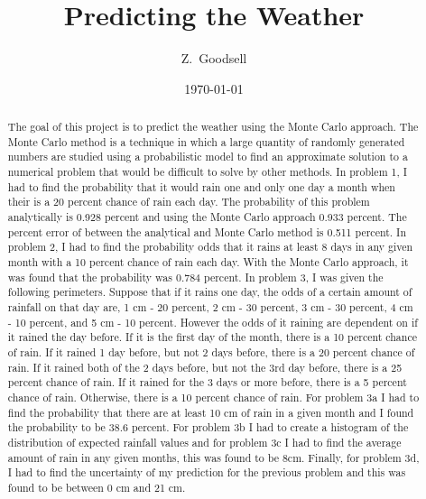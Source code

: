 \documentclass[twocolumn]{revtex4}
\begin{document}
\title{
Predicting the Weather
}

\author{Z.~Goodsell}

\date{\today}

\begin{abstract}
The goal of this project is to predict the weather using the Monte Carlo approach. The Monte Carlo method is a technique in which a large quantity of randomly generated numbers are studied using a probabilistic model to find an approximate solution to a numerical problem that would be difficult to solve by other methods. In problem 1, I had to find the probability that it would rain one and only one day a month when their is a 20 percent chance of rain each day. The probability of this problem analytically is 0.928 percent and using the Monte Carlo approach 0.933 percent. The percent error of between the analytical and Monte Carlo method is 0.511 percent. In problem 2, I had to find the probability odds that it rains at least 8 days in any given month with a 10 percent chance of rain each day. With the Monte Carlo approach, it was found that the probability was 0.784 percent. In problem 3, I was given the following perimeters. Suppose that if it rains one day, the odds of a certain amount of rainfall on that day are, 1 cm - 20 percent, 2 cm - 30 percent, 3 cm - 30 percent, 4 cm - 10 percent, and  5 cm - 10 percent. However the odds of it raining are dependent on if it rained the day before. If it is the first day of the month, there is a 10 percent chance of rain. If it rained 1 day before, but not 2 days before, there is a 20 percent chance of rain.  If it rained both of the 2 days before, but not the 3rd day before, there is a 25 percent chance of rain.  If it rained for the 3 days or more before, there is a 5 percent chance of rain.  Otherwise, there is a 10 percent chance of rain. For problem 3a I had to find the probability that there are at least 10 cm of rain in a given month and I found the probability to be 38.6 percent. For problem 3b I had to create a histogram of the distribution of expected rainfall values and for problem 3c I had to find the average amount of rain in any given months, this was found to be 8cm. Finally, for problem 3d, I had to find the uncertainty of my prediction for the previous problem and this was found to be between 0 cm and 21 cm.
\end{abstract}

\maketitle
\end{document}
